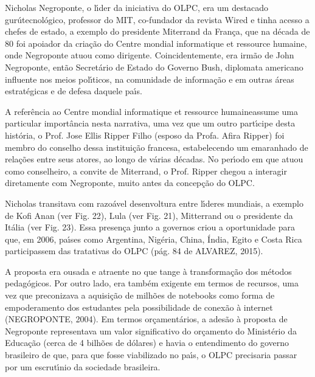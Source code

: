 \documentclass[
12pt,		%
openright,	%
twoside,  %
a4paper,			%
chapter=TITLE,		%
english,			%
french,				%
spanish,			%
brazil				%
]{USPSC-classe/USPSC}
\begin{document}
Nicholas Negroponte, o l\'{\i}der da iniciativa do OLPC, era um destacado \textquotedbl gur\'u\textquotedbl  tecnol\'ogico, professor do MIT, co-fundador da revista Wired e tinha acesso a chefes de estado, a exemplo do presidente Miterrand da Fran\c{c}a, que na d\'ecada de 80 foi apoiador da cria\c{c}\~ao do \textquotedbl Centre mondial informatique et ressource humaine\textquotedbl , onde Negroponte atuou como dirigente. Coincidentemente, era irm\~ao de John Negroponte, ent\~ao Secret\'ario de Estado do Governo Bush, diplomata americano influente nos meios pol\'{\i}ticos, na comunidade de informa\c{c}\~ao e em outras \'areas estrat\'egicas e de defesa daquele pa\'{\i}s.








A refer\^encia ao \textquotedbl Centre mondial informatique et ressource humaine\textquotedbl  assume uma particular import\^ancia nesta narrativa, uma vez que um outro part\'{\i}cipe desta hist\'oria, o Prof. Jose Ellis Ripper Filho (esposo da Profa. Afira Ripper) foi membro do conselho dessa institui\c{c}\~ao francesa, estabelecendo um emaranhado de rela\c{c}\~oes entre seus atores, ao longo de v\'arias d\'ecadas. No per\'{\i}odo em que atuou como conselheiro, a convite de Miterrand, o Prof. Ripper chegou a interagir diretamente com Negroponte, muito antes da concep\c{c}\~ao do OLPC.








Nicholas transitava com razo\'avel desenvoltura entre l\'{\i}deres mundiais, a exemplo de Kofi Anan (ver Fig. 22), Lula (ver Fig. 21), Mitterrand ou o presidente da It\'alia (ver Fig. 23). Essa presen\c{c}a junto a governos criou a oportunidade para que, em 2006, pa\'{\i}ses como Argentina, Nig\'eria, China, \'India, Egito e Costa Rica participassem das tratativas do OLPC  (p\'ag. 84 de ALVAREZ, 2015).








A proposta era ousada e atraente no que tange \`a transforma\c{c}\~ao dos m\'etodos pedag\'ogicos. Por outro lado, era tamb\'em exigente em termos de recursos, uma vez que preconizava a aquisi\c{c}\~ao de milh\~oes de notebooks como forma de empoderamento dos estudantes pela possibilidade de conex\~ao \`a internet  (NEGROPONTE, 2004). Em termos or\c{c}ament\'arios, a ades\~ao \`a proposta de Negroponte representava um valor significativo do or\c{c}amento do Minist\'erio da Educa\c{c}\~ao (cerca de 4 bilh\~oes de d\'olares) e havia o entendimento do governo brasileiro de que, para que fosse viabilizado no pa\'{\i}s, o OLPC precisaria passar por um escrut\'{\i}nio da sociedade brasileira.
\end{document}
